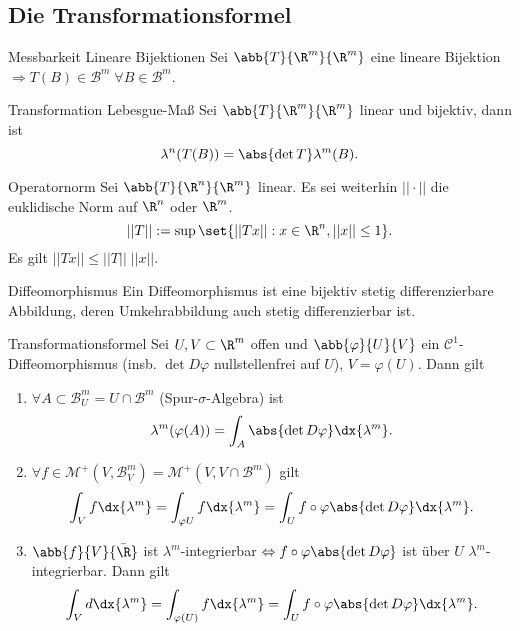 \subsection*{Die Transformationsformel}

\begin{karte}{Messbarkeit Lineare Bijektionen}
    Sei \( \abb{T}{\R^m}{\R^m} \) eine lineare Bijektion 
    \( \Rightarrow T(B) \in \mathcal{B}^m \;\forall B\in \mathcal{B}^m \).
\end{karte}

\begin{karte}{Transformation Lebesgue-Maß}
    Sei \( \abb{T}{\R^m}{\R^m} \) linear und bijektiv, 
    dann ist 
    \[ \lambda^n(T(B)) = \abs{\det T} \lambda^m(B). \]
\end{karte}

\begin{karte}{Operatornorm}
    Sei \( \abb{T}{\R^n}{\R^m} \) linear. Es sei weiterhin 
    \( ||\cdot|| \) die euklidische Norm auf \(\R^n \) oder \(\R^m\). 
    \[ ||T|| := \sup\set{||Tx||:x\in \R^n, ||x||\leq 1}. \]
    Es gilt 
    \( ||Tx|| \leq ||T|| \;||x|| \).
\end{karte}

\begin{karte}{Diffeomorphismus}
    Ein Diffeomorphismus ist eine bijektiv stetig differenzierbare Abbildung, 
    deren Umkehrabbildung auch stetig differenzierbar ist.
\end{karte}

\begin{karte}{Transformationsformel}
    Sei \( U,V\subset \R^m \) offen und \( \abb{\varphi}{U}{V} \) 
    ein \( \mathcal{C}^1 \)-Diffeomorphismus (insb. \( \det D\varphi \) nullstellenfrei auf \(U\)), 
    \(V = \varphi(U)\). Dann gilt 
    \begin{enumerate}
        \item \( \forall A \subset \mathcal{B}_U^m = U \cap \mathcal{B}^m\) (Spur-\(\sigma\)-Algebra) ist 
        \[ \lambda^m(\varphi(A)) = \int_A \abs{\det D\varphi} \dx{\lambda^m}. \]
        \item \( \forall f\in \mathcal{M}^+(V, \mathcal{B}_V^m) 
        = \mathcal{M}^+(V, V \cap \mathcal{B}^m) \) gilt 
        \[ \int_V f \dx{\lambda^m} = \int_{\varphi U} f \dx{\lambda^m} 
        = \int_U f\circ \varphi \abs{\det D\varphi} \dx{\lambda^m}. \]
        \item \( \abb{f}{V}{\bar{\R}} \) ist \( \lambda^m \)-integrierbar 
        \( \Leftrightarrow f \circ \varphi \abs{\det D\varphi} \) 
        ist über \(U\) \(\lambda^m\)-integrierbar. Dann gilt 
        \[ \int_V d \dx{\lambda^m} = \int_{\varphi(U)} f \dx{\lambda^m} 
        = \int_U f \circ \varphi \abs{\det D\varphi} \dx{\lambda^m}. \]
    \end{enumerate}
\end{karte}

